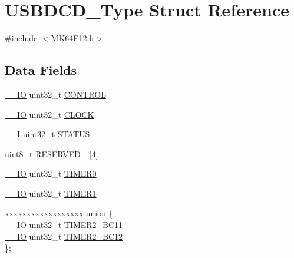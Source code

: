 \hypertarget{struct_u_s_b_d_c_d___type}{}\section{U\+S\+B\+D\+C\+D\+\_\+\+Type Struct Reference}
\label{struct_u_s_b_d_c_d___type}


{\ttfamily \#include $<$M\+K64\+F12.\+h$>$}

\subsection*{Data Fields}
\begin{DoxyCompactItemize}
\item 
\mbox{\hyperlink{core__cm4_8h_aec43007d9998a0a0e01faede4133d6be}{\+\_\+\+\_\+\+IO}} uint32\+\_\+t \mbox{\hyperlink{group___v_r_e_f___peripheral___access___layer_ga60054d9772af540ff3d88432d724137f}{C\+O\+N\+T\+R\+OL}}
\item 
\mbox{\hyperlink{core__cm4_8h_aec43007d9998a0a0e01faede4133d6be}{\+\_\+\+\_\+\+IO}} uint32\+\_\+t \mbox{\hyperlink{group___v_r_e_f___peripheral___access___layer_gae883ef34c3cebbf0536f20bfa53e5c51}{C\+L\+O\+CK}}
\item 
\mbox{\hyperlink{core__cm4_8h_af63697ed9952cc71e1225efe205f6cd3}{\+\_\+\+\_\+I}} uint32\+\_\+t \mbox{\hyperlink{group___v_r_e_f___peripheral___access___layer_gaece2c880dc5ba01a2fc9326dc080dc26}{S\+T\+A\+T\+US}}
\item 
uint8\+\_\+t \mbox{\hyperlink{group___v_r_e_f___peripheral___access___layer_ga71277aaa40be4473ac2521981f273bd3}{R\+E\+S\+E\+R\+V\+E\+D\+\_}} \mbox{[}4\mbox{]}
\item 
\mbox{\hyperlink{core__cm4_8h_aec43007d9998a0a0e01faede4133d6be}{\+\_\+\+\_\+\+IO}} uint32\+\_\+t \mbox{\hyperlink{group___v_r_e_f___peripheral___access___layer_ga53736efbc01ccdca17ec2bb80e6541a6}{T\+I\+M\+E\+R0}}
\item 
\mbox{\hyperlink{core__cm4_8h_aec43007d9998a0a0e01faede4133d6be}{\+\_\+\+\_\+\+IO}} uint32\+\_\+t \mbox{\hyperlink{group___v_r_e_f___peripheral___access___layer_ga488da43683bd603819fd5f6676aef010}{T\+I\+M\+E\+R1}}
\item 
\begin{tabbing}
xx\=xx\=xx\=xx\=xx\=xx\=xx\=xx\=xx\=\kill
union \{\\
\>\mbox{\hyperlink{core__cm4_8h_aec43007d9998a0a0e01faede4133d6be}{\_\_IO}} uint32\_t \mbox{\hyperlink{group___v_r_e_f___peripheral___access___layer_ga83314016b4061d012e5bdbef334cf9f1}{TIMER2\_BC11}}\\
\>\mbox{\hyperlink{core__cm4_8h_aec43007d9998a0a0e01faede4133d6be}{\_\_IO}} uint32\_t \mbox{\hyperlink{group___v_r_e_f___peripheral___access___layer_gab057146a69560e422a2d325bb2c0a677}{TIMER2\_BC12}}\\
\}; \\

\end{tabbing}\end{DoxyCompactItemize}


